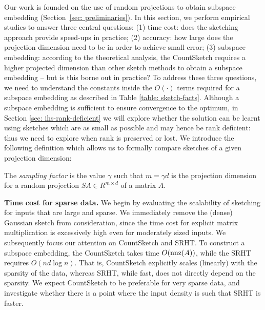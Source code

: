 \newcommand{\eat}[1]{}
\newcommand{\SRHT}{SRHT\xspace}

Our work is founded on the use of random projections to obtain
subspace embedding (Section~\ref{sec: preliminaries}).
In this section, we perform empirical studies to answer three central
questions:
(1) time cost: does the sketching approach provide speed-ups in
practice;
(2) accuracy: how large does the projection dimension need to be in
order to achieve small error;
(3) subspace embedding:
according to the theoretical analysis, the CountSketch requires a
higher projected dimension than other sketch methods to obtain a
subspace embedding -- but is this borne out in practice?
To address these three questions, we need to understand the constants inside
the $O(\cdot)$ terms required for a subspace embedding as described in Table
\ref{table: sketch-facts}.
Although a subspace embedding is sufficient to ensure convergence to the optimum,
in Section \ref{sec: ihs-rank-deficient} we will explore whether the solution can be learnt using
sketches which are as small as possible and may hence be rank deficient:
thus we need to explore when rank is preserved or lost.
We introduce the following definition which allows us to formally compare sketches
of a given projection dimension:

\begin{mydef} \label{def: sampling-factor}
The \textit{sampling factor} is the value $\gamma$ such that $m = \gamma d$
is the projection dimension for a random projection $SA \in R^{m \times d}$
of a matrix $A$.
\end{mydef}

\eat{
As outlined in Section \ref{sec: preliminaries} the key quantity that we would
like to understand is the subspace embedding.
The central questions we seek to answer are: (1) whether the time complexity
in practise matches the theory, (2) how large should the projection
dimension be in order to obtain small error (3) the CountSketch
theoretically requires a larger projection to obtain the subspace embedding
property, is this reflected in practise?}

\medskip
\noindent\textbf{Time cost for sparse data.}
We begin by evaluating the scalability of sketching for inputs that
are large and sparse.
We immediately remove the (dense) Gaussian sketch from consideration,
since the time cost for explicit matrix multiplication is excessively
high even for moderately sized inputs.
We subsequently focus our attention on CountSketch and \SRHT.
To construct a subspace embedding,
the CountSketch takes
time $O(\text{nnz}(A))$, while the \SRHT requires $O(nd \log n)$.
That is, CountSketch explicitly scales (linearly) with the sparsity of
the data, whereas \SRHT, while fast, does not directly depend on the
sparsity.
We expect CountSketch to be preferable for very sparse data,
and investigate whether there is a point where the input density is
such that \SRHT is faster.

